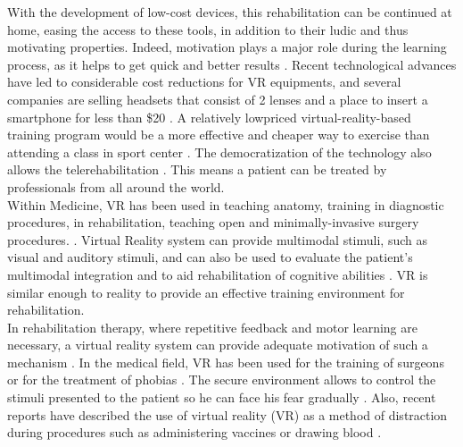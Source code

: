 \documentclass[12pt, openany, twocolumn]{article}
\begin{document}
With the development of low-cost devices, this rehabilitation can be continued at home, easing the access to these tools, in addition to their ludic and thus motivating properties.
Indeed, motivation plays a major role during the learning process, as it helps to get quick and better results \cite{kangBenefitRetrievalPractice2014, christophelRelationshipsTeacherImmediacy1990, kinzieRequirementsBenefitsEffective1990b}.
Recent technological advances have led to considerable cost reductions for VR equipments, and several companies are selling headsets that consist of 2 lenses and a place to insert a smartphone for less than \$20 \cite{araneVirtualRealityPain2017}.
A relatively lowpriced virtual-reality-based training program would be a more effective and cheaper way to exercise than attending a class in sport center \cite{kimEffectsVRbasedWii2014}.
The democratization of the technology also allows the telerehabilitation \cite{burdeaVirtualRehabilitationBenefits2003}. This means a patient can be treated by professionals from all around the world. 
\\

Within Medicine, VR has been used in teaching anatomy, training in diagnostic procedures, in rehabilitation, teaching open and minimally-invasive surgery procedures.  \cite{burdeaVirtualRehabilitationBenefits2003}.
Virtual Reality system can provide multimodal stimuli, such as visual and auditory stimuli, and can also be used to evaluate the patient’s multimodal integration and to aid rehabilitation of cognitive abilities \cite{bioulacQuApportentOutils2018, morelAdvantagesLimitationsVirtual2015}. 
VR is similar enough to reality to provide an effective training environment for rehabilitation.
\\

In rehabilitation therapy, where repetitive feedback and motor learning are necessary, a virtual reality system can provide adequate motivation of such a mechanism \cite{kimEffectsVRbasedWii2014}.
In the medical field, VR has been used for the training of surgeons \cite{laverVirtualRealityStroke2017} or for the treatment of phobias \cite{morelAdvantagesLimitationsVirtual2015}. The secure environment allows to control the stimuli presented to the patient so he can face his fear gradually \cite{morelAdvantagesLimitationsVirtual2015}.
Also, recent reports have described the use of virtual reality (VR) as a method of distraction during procedures such as administering vaccines or drawing blood \cite{araneVirtualRealityPain2017}.
\\
\end{document}
